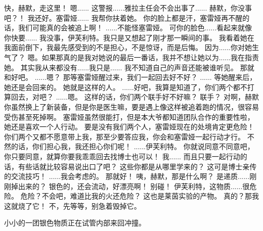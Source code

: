 \documentclass[openany]{book}
\begin{document}
\begin{dialogue}
     快，赫默，走这里！
     嗯......
     这警报......雅拉主任会不会出事了......
     赫默，你没事吧？！
     我还好。塞雷娅......
     我帮你扶着她。
     你的脸上都是汗，塞雷娅再不醒的话，我们可能真的会被追上啊！
     ......不能怪塞雷娅。
     可你的脸色......看起来就像你快要......
     我没事，伊芙利特。我只是又想起了刚才那一瞬间的事。
     我看着她在我面前倒下，我最先感受到的不是担心，不是惊讶，而是后悔。
     因为......你对她生气了？
     嗯。如果那真的是我对她说的最后一番话，我并不想让她以为......我在指责她。
     其实我从来都没有......我只是......
     我不知道自己的声音还能被谁听见。
     那就和好吧。
     ......嗯？
     那等塞雷娅醒过来，我们一起回去好不好？
     ......
     等她醒来后，她还是会回来的。
     她就是这样的人。
     ......好吧，我算是知道了，你们两个都不打算回去，对吧？
     ......嗯。
     这样的话，你们两个联手好不好嘛？
     联手？
     对啊，赫默你虽然换上了新装备，但是你是医生嘛，要是遇上像这样被追着跑的情况，很容易受伤甚至死掉啊。
     塞雷娅虽然很能打，但是本大爷都知道团队合作的重要性啦，她还是喜欢一个人行动。
     要是没有我们两个人，塞雷娅现在的处境肯定更危险！
     你们两个又都不愿意带上我，那至少要答应我，你会和塞雷娅一起行动才行。
     不然的话，你们担心我，我还担心你们呢！
     ......伊芙利特。
     你就说同意不同意吧，你只要同意，就算你要我乖乖回去找博士也可以！
     我......
     而且只要一起行动的话，有些话就比较容易说出口了吧？
     这些你都是从哪里学来的？
     这可是博士亲传的交流技巧！
     ......我会考虑的。
     那就好！
     咦，赫默，那是什么啊？
     是递质......刚刚掉出来的？
     银色的，还会流动，好漂亮啊！
     别碰！
     伊芙利特，这物质......很危险。
     危险？不会吧，难道比我的火还危险？
     这也是莱茵实验的产物。
     真的？那我这就烧了它！
     不，先等等，别急着毁掉它。\par
    小小的一团银色物质正在试管内部来回冲撞。\\

\end{dialogue}
\end{document}
